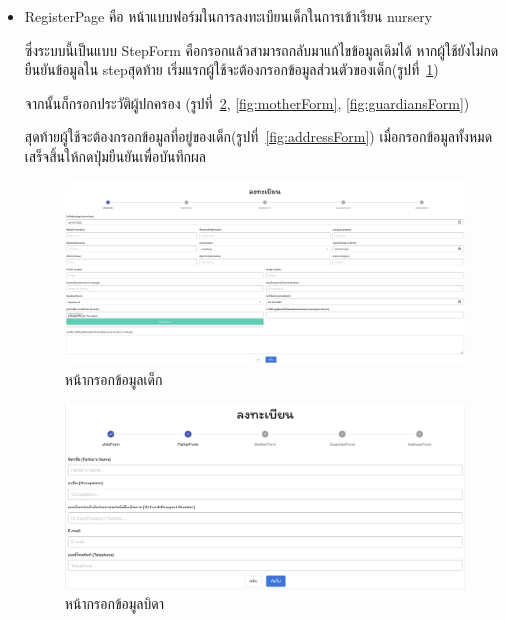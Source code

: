 \begin{itemize}
  \item RegisterPage คือ หน้าแบบฟอร์มในการลงทะเบียนเด็กในการเข้าเรียน nursery 
  
  ซึ่งระบบนี้เป็นแบบ StepForm คือกรอกแล้วสามารถกลับมาแก้ไขข้อมูลเดิมได้ หากผู้ใช้ยังไม่กดยืนยันข้อมูลใน stepสุดท้าย
  เริ่มแรกผู้ใช้จะต้องกรอกข้อมูลส่วนตัวของเด็ก(รูปที่~\ref{fig:register}) 
  
  จากนั้นก็กรอกประวัติผู้ปกครอง (รูปที่~\ref{fig:fatherForm}, \ref{fig:motherForm}, \ref{fig:guardiansForm})
  
  สุดท้ายผู้ใช้จะต้องกรอกข้อมูลที่อยู่ของเด็ก(รูปที่~\ref{fig:addressForm}) เมื่อกรอกข้อมูลทั้งหมดเสร็จสิ้นให้กดปุ่มยืนยันเพื่อบันทึกผล
  
    \begin{figure}
      \begin{center}
      \includegraphics[width=\linewidth]{images/RegisterForm.png}
      \end{center}
      \caption[หน้ากรอกข้อมูลเด็ก]{หน้ากรอกข้อมูลเด็ก}
      \label{fig:register}
    \end{figure}
  
  
    \begin{figure}
      \begin{center}
      \includegraphics[width=\linewidth]{images/fatherForm.png}
      \end{center}
      \caption[หน้ากรอกข้อมูลบิดา]{หน้ากรอกข้อมูลบิดา}
      \label{fig:fatherForm}
    \end{figure}
  

\end{itemize}
